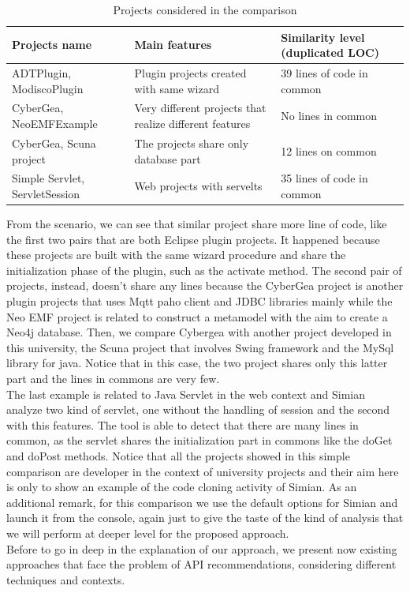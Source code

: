 \begin{center}
\begin{table}[!h]
  \caption{ Projects considered in the comparison }
  \label{Table:4}
\begin{adjustbox}{width=1\textwidth}
\small
\begin{tabular}{|l|p{5cm}|p{3cm}|}

\hline
 \textbf{Projects name} &  \textbf{Main features}  & \textbf{Similarity level (duplicated LOC)}  \\
\hline
 ADTPlugin, ModiscoPlugin   &  Plugin projects created with same wizard & 39 lines of code in common\\
\hline
CyberGea, NeoEMFExample &   Very different projects that realize different features & No lines in common\\
\hline
CyberGea, Scuna project & The projects share only database part & 12 lines on common  \\
\hline
Simple Servlet, ServletSession &  Web projects with servelts & 35 lines of code in common  \\
\hline
\end{tabular}

\end{adjustbox}
\end{table} 
\end{center}

From the scenario, we can see that similar project share more line of code, like the first two pairs that are both Eclipse plugin projects. It happened because these projects are built with the same wizard procedure and share the initialization phase of the plugin, such as the activate method. The second pair of projects, instead, doesn't share any lines because the CyberGea project is another plugin projects that uses Mqtt paho client and JDBC libraries mainly while the Neo EMF project is related to construct a metamodel with the aim to create a Neo4j database. Then, we compare Cybergea with another project developed in this university, the Scuna project that involves Swing framework and the MySql library for java. Notice that in this case, the two project shares only this latter part and the lines in commons are very few. \\
The last example is related to Java Servlet in the web context and Simian analyze two kind of servlet, one without the handling of session and the second with this features. The tool is able to detect that there are many lines in common, as the servlet shares the initialization part in commons like the doGet and doPost methods. Notice that all the projects showed in this simple comparison are developer in the context of university projects and their aim here is only to show an example of the code cloning activity of Simian. As an additional remark, for this comparison we use the default options for Simian and launch it from the console, again just to give the taste of the kind of analysis that we will perform at deeper level for the proposed approach. \\ 
Before to go in deep in the explanation of our approach, we present now existing approaches that face the problem of API recommendations, considering different techniques and contexts.
